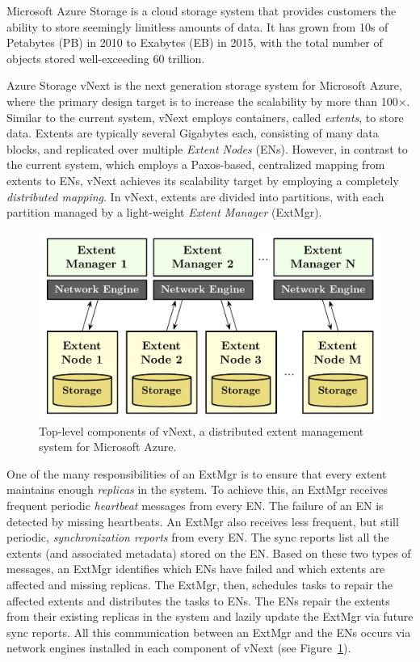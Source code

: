 Microsoft Azure Storage is a cloud storage system that provides customers the ability to store seemingly limitless amounts of data. It has grown from 10s of Petabytes (PB) in 2010 to Exabytes (EB) in 2015, with the total number of objects stored well-exceeding 60 trillion.

Azure Storage vNext is the next generation storage system for Microsoft Azure, where the primary design target is to increase the scalability by more than 100$\times$. Similar to the current system, vNext employs containers, called {\em extents}, to store data. Extents are typically several Gigabytes each, consisting of many data blocks, and replicated over multiple {\em Extent Nodes} (ENs). However, in contrast to the current system, which employs a Paxos-based, centralized mapping from extents to ENs, vNext achieves its scalability target by employing a completely \emph{distributed mapping}. In vNext, extents are divided into partitions, with each partition managed by a light-weight {\em Extent Manager} (ExtMgr).

\begin{figure}[t]
\centering
\includegraphics[width=\linewidth]{img/azurestore}
\caption{Top-level components of vNext, a distributed extent management system for Microsoft Azure.}
\label{fig:vnext}
\end{figure}

One of the many responsibilities of an ExtMgr is to ensure that every extent maintains enough \emph{replicas} in the system. To achieve this, an ExtMgr receives frequent periodic \emph{heartbeat} messages from every EN. The failure of an EN is detected by missing heartbeats. An ExtMgr also receives less frequent, but still periodic, {\em synchronization reports} from every EN. The sync reports list all the extents (and associated metadata) stored on the EN. Based on these two types of messages, an ExtMgr identifies which ENs have failed and which extents are affected and missing replicas. The ExtMgr, then, schedules tasks to repair the affected extents and distributes the tasks to ENs. The ENs repair the extents from their existing replicas in the system and lazily update the ExtMgr via future sync reports. All this communication between an ExtMgr and the ENs occurs via network engines installed in each component of vNext (see Figure~\ref{fig:vnext}).


